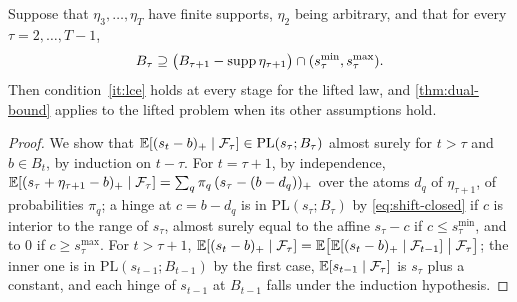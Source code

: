 \begin{proposition}
\label{prop:shift-closed}
Suppose that $\eta_3, \dots, \eta_T$ have finite supports, $\eta_2$ being arbitrary, and that for every $\tau = 2, \dots, T - 1$,
\begin{equation}
\label{eq:shift-closed}
B_\tau \supseteq \bigl(B_{\tau+1} - \operatorname{supp}\eta_{\tau+1}\bigr) \cap (s_\tau^{\min}, s_\tau^{\max}).
\end{equation}
Then condition~\ref{it:lce} holds at every stage for the lifted law, and \cref{thm:dual-bound} applies to the lifted problem when its other assumptions hold.
\end{proposition}

\begin{proof}
We show that $\mathbb{E}[(s_t - b)_+ \mid \mathcal F_\tau] \in \mathrm{PL}(s_\tau; B_\tau)$ almost surely for $t > \tau$ and $b \in B_t$, by induction on $t - \tau$.
For $t = \tau + 1$, by independence, $\mathbb{E}[(s_\tau + \eta_{\tau+1} - b)_+ \mid \mathcal F_\tau] = \sum_q \pi_q\,(s_\tau - (b - d_q))_+$ over the atoms $d_q$ of $\eta_{\tau+1}$, of probabilities $\pi_q$;
a hinge at $c = b - d_q$ is in $\mathrm{PL}(s_\tau; B_\tau)$ by \eqref{eq:shift-closed} if $c$ is interior to the range of $s_\tau$, almost surely equal to the affine $s_\tau - c$ if $c \le s_\tau^{\min}$, and to $0$ if $c \ge s_\tau^{\max}$.
For $t > \tau + 1$, $\mathbb{E}[(s_t - b)_+ \mid \mathcal F_\tau] = \mathbb{E}\bigl[\mathbb{E}[(s_t - b)_+ \mid \mathcal F_{t-1}] \bigm| \mathcal F_\tau\bigr]$;
the inner one is in $\mathrm{PL}(s_{t-1}; B_{t-1})$ by the first case, $\mathbb{E}[s_{t-1} \mid \mathcal F_\tau]$ is $s_\tau$ plus a constant, and each hinge of $s_{t-1}$ at $B_{t-1}$ falls under the induction hypothesis.
\end{proof}

